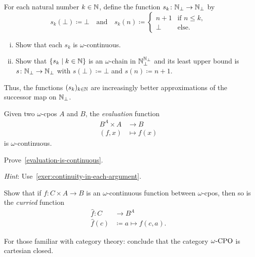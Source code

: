 \begin{exercise}\label{exer:approximating-successor}
  For each natural number \(k \in \mathbb N\), define the function
  \(s_k \colon \mathbb N_\bot \to \mathbb N_\bot\) by
  \[
    s_k(\bot) \coloneqq \bot
    \quad\text{and}\quad
    s_k(n) \coloneqq
    \begin{cases}
      n+1 &\text{if \(n \leq k\)},
      \\ \bot &\text{else}.
    \end{cases}
  \]
  \begin{enumerate}[(i)]
  \item Show that each \(s_k\) is \(\omega\)-continuous.
  \item Show that \(\{s_k \mid k \in \mathbb N\}\) is an \(\omega\)-chain in
    \(\mathbb N_\bot^{\mathbb N_\bot}\) and its least upper bound is
    \(s \colon \mathbb N_\bot \to \mathbb N_\bot\) with \(s(\bot) \coloneqq \bot\) and
    \(s(n) \coloneqq n+1\).
  \end{enumerate}
  Thus, the functions \((s_k)_{k \in \mathbb N}\) are increasingly better approximations of the
  successor map on \(\mathbb N_\bot\).
\end{exercise}

\begin{lemma}\label{evaluation-is-continuous}
  Given two \(\omega\)-cpos \(A\) and \(B\), the \emph{evaluation} function
  \begin{align*}
    B^A \times A &\to B \\
    (f,x) &\mapsto f(x)
  \end{align*}
  is \(\omega\)-continuous.
\end{lemma}
\begin{exercise}\label{exer:evaluation-is-continuous}
  Prove~\cref{evaluation-is-continuous}.

  \emph{Hint}: Use~\cref{exer:continuity-in-each-argument}.
\end{exercise}

\begin{exercise}\label{exer:curry-is-continuous}
  Show that if \(f \colon C \times A \to B\) is an \(\omega\)-continuous
  function between \(\omega\)-cpos, then so is the \emph{curried} function
  \begin{align*}
    \hat{f} \colon C &\to B^A \\
    \hat{f}(c) &\coloneqq a \mapsto f(c,a).
  \end{align*}

  For those familiar with category theory: conclude that the category
  \(\omegaCPO\) is cartesian closed.
\end{exercise}

